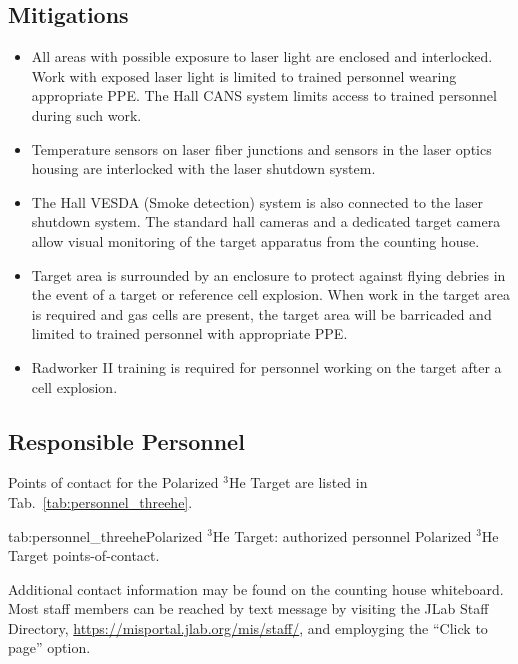 \subsection{Mitigations}
\begin{itemize}
\item All areas with possible exposure to laser light are enclosed and
  interlocked.  Work with exposed laser light is limited to trained
  personnel wearing appropriate PPE.  The Hall CANS system limits
  access to trained personnel during such work.
\item Temperature sensors on laser fiber junctions and sensors in the
  laser optics housing are interlocked with the laser shutdown
  system.
\item   The Hall VESDA (Smoke detection) system is also connected
  to the laser shutdown system.  The standard hall cameras and a
  dedicated target camera allow visual monitoring of the target
  apparatus from the counting house.
\item Target area is surrounded by an enclosure to protect against flying
  debries in the event of a target or reference cell explosion.  When
work in the target area is required and gas cells are present, the
target area will be barricaded and limited to trained personnel with
appropriate PPE.
\item Radworker II training is required for personnel working on the
  target after a cell explosion.
\end{itemize}

\subsection{Responsible Personnel}

Points of contact for the Polarized ${}^3$He Target are listed in Tab.~\ref{tab:personnel_threehe}.

\begin{namestab}{tab:personnel_threehe}{Polarized ${}^3$He Target: authorized personnel}
   {Polarized ${}^3$He Target points-of-contact.}
  \ArunTadepalli{}
\end{namestab}

Additional contact information may be found on the counting house
whiteboard.  Most staff members can be reached by text message by
visiting the JLab Staff Directory,
\url{https://misportal.jlab.org/mis/staff/}, and employging
the ``Click to page'' option.


